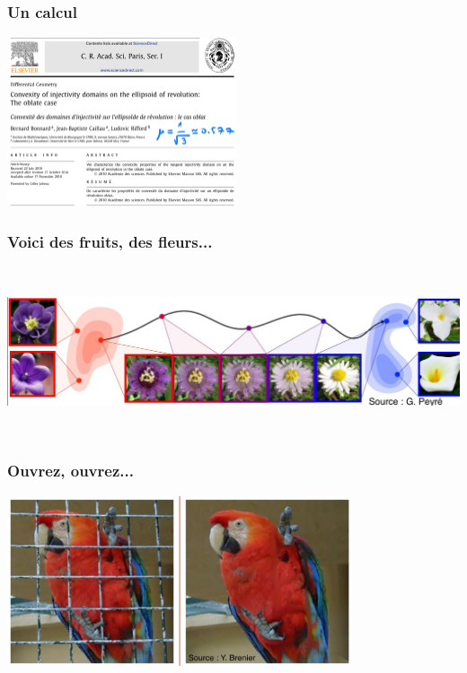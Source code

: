 \documentclass[9pt]{beamer}
\begin{document}
\begin{frame}
\frametitle{\bf Un calcul}
 
\centering \includegraphics[height=5.0cm]{cras2}

\end{frame}

\begin{frame}
\frametitle{\bf Voici des fruits, des fleurs...}
 
\centering \includegraphics[height=5.0cm]{fleur}

\end{frame}

\begin{frame}
\frametitle{\bf Ouvrez, ouvrez...}
 
\centering \includegraphics[height=5.0cm]{parrot}

\end{frame}
\end{document}
